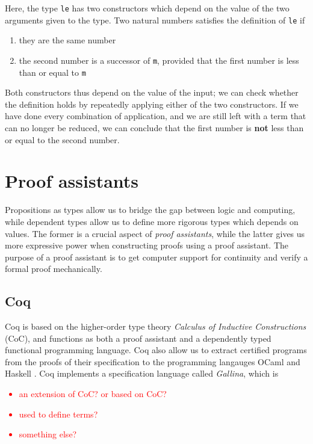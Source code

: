 Here, the type \lstinline{le} has two constructors which depend on the value of the two arguments given to the type.
Two natural numbers satisfies the definition of \lstinline{le} if
\begin{enumerate}
    \item they are the same number
    \item the second number is a successor of \lstinline{m},
        provided that the first number is less than or equal to \lstinline{m}
\end{enumerate}

Both constructors thus depend on the value of the input;
we can check whether the definition holds by repeatedly applying
either of the two constructors. If we have done every combination of
application, and we are still left with a term that can no longer be reduced,
we can conclude that the first number is \textbf{not} less than or equal to the second number.

\section{Proof assistants}

Propositions as types allow us to bridge the gap between logic and computing,
while dependent types allow us to define more rigorous types which depends on values.
The former is a crucial aspect of \textit{proof assistants}, while the latter gives
us more expressive power when constructing proofs using a proof assistant.
The purpose of a proof assistant is to get computer support for continuity and verify a formal proof mechanically.

\subsection{Coq}
Coq is based on the higher-order type theory \textit{Calculus of Inductive Constructions} (CoC), and
functions as both a proof assistant and a dependently typed functional programming language.
Coq also allow us to extract certified programs from the proofs of their specification to
the programming langauges OCaml and Haskell \cite{cintro}.
Coq implements a specification language called \textit{Gallina}, which is

\textcolor{red}{
    \begin{itemize}
        \item an extension of CoC? or based on CoC?
        \item used to define terms?
        \item something else?
    \end{itemize}
}

